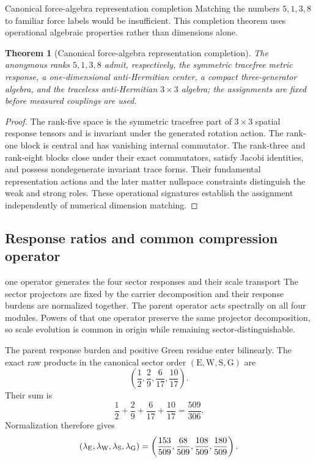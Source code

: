 \documentclass[11pt]{article}
\numberwithin{equation}{section}
\newtheorem{theorem}[definition]{Theorem}
\theoremstyle{remark}
\begin{document}
\begin{proofguide}{Canonical force-algebra representation completion}
Matching the numbers $5,1,3,8$ to familiar force labels would be insufficient. This completion theorem uses operational algebraic properties rather than dimensions alone.
\end{proofguide}
\begin{theorem}[Canonical force-algebra representation completion]
The anonymous ranks $5,1,3,8$ admit, respectively, the symmetric tracefree metric response, a one-dimensional anti-Hermitian center, a compact three-generator algebra, and the traceless anti-Hermitian $3\times3$ algebra; the assignments are fixed before measured couplings are used.
\end{theorem}
\begin{proof}
The rank-five space is the symmetric tracefree part of $3\times3$ spatial response tensors and is invariant under the generated rotation action. The rank-one block is central and has vanishing internal commutator. The rank-three and rank-eight blocks close under their exact commutators, satisfy Jacobi identities, and possess nondegenerate invariant trace forms. Their fundamental representation actions and the later matter nullspace constraints distinguish the weak and strong roles. These operational signatures establish the assignment independently of numerical dimension matching.
\end{proof}

\subsection{Response ratios and common compression operator}
\begin{interpretivebridge}{one operator generates the four sector responses and their scale transport}
The sector projectors are fixed by the carrier decomposition and their response burdens are normalized together. The parent operator acts spectrally on all four modules. Powers of that one operator preserve the same projector decomposition, so scale evolution is common in origin while remaining sector-distinguishable.
\end{interpretivebridge}

The parent response burden and positive Green residue enter bilinearly. The exact raw products in the canonical sector order $(\mathrm E,\mathrm W,\mathrm S,\mathrm G)$ are
\begin{equation}
\left(\frac12,\frac29,\frac6{17},\frac{10}{17}\right).
\end{equation}
Their sum is
\begin{equation}
\frac12+\frac29+\frac6{17}+\frac{10}{17}=\frac{509}{306}.
\end{equation}
Normalization therefore gives
\begin{equation}
(\lambda_{\rm E},\lambda_{\rm W},\lambda_{\rm S},\lambda_{\rm G})
=\left(\frac{153}{509},\frac{68}{509},\frac{108}{509},\frac{180}{509}\right).
\end{equation}
\end{document}
